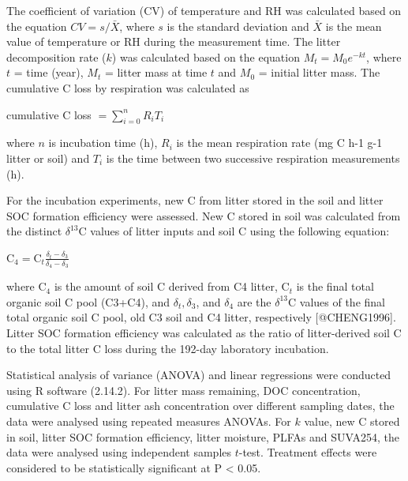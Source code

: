 \documentclass[
]{article}
\begin{document}
The coefficient of variation (CV) of temperature and RH was calculated
based on the equation \(CV = s/\bar{X}\), where \(s\) is the standard
deviation and \(\bar{X}\) is the mean value of temperature or RH during
the measurement time. The litter decomposition rate (\(k\)) was
calculated based on the equation \(M_{t} = M_{0}e^{-kt}\), where \(t\) =
time (year), \(M_{t}\) = litter mass at time \(t\) and \(M_0\) = initial
litter mass. The cumulative C loss by respiration was calculated as

cumulative C loss \(= \displaystyle\sum_{i=0}^n R_iT_i\)

where \(n\) is incubation time (h), \(R_i\) is the mean respiration rate
(mg C h-1 g-1 litter or soil) and \(T_i\) is the time between two
successive respiration measurements (h).

For the incubation experiments, new C from litter stored in the soil and
litter SOC formation efficiency were assessed. New C stored in soil was
calculated from the distinct \(\delta^{13}\)C values of litter inputs
and soil C using the following equation:

\(\mathrm{C}_4 = \mathrm{C}_t \frac{\delta_t - \delta_3}{\delta_4-\delta_3}\)

where \(\mathrm{C}_4\) is the amount of soil C derived from C4 litter,
\(\mathrm{C}_t\) is the final total organic soil C pool (C3+C4), and
\(\delta_t,\delta_3\), and \(\delta_4\) are the \(\delta^{13}\)C values
of the final total organic soil C pool, old C3 soil and C4 litter,
respectively {[}@CHENG1996{]}. Litter SOC formation efficiency was
calculated as the ratio of litter-derived soil C to the total litter C
loss during the 192-day laboratory incubation.

Statistical analysis of variance (ANOVA) and linear regressions were
conducted using R software (2.14.2). For litter mass remaining, DOC
concentration, cumulative C loss and litter ash concentration over
diﬀerent sampling dates, the data were analysed using repeated measures
ANOVAs. For \(k\) value, new C stored in soil, litter SOC formation
eﬃciency, litter moisture, PLFAs and SUVA254, the data were analysed
using independent samples \(t\)-test. Treatment eﬀects were considered
to be statistically signiﬁcant at P \textless{} 0.05.
\end{document}
